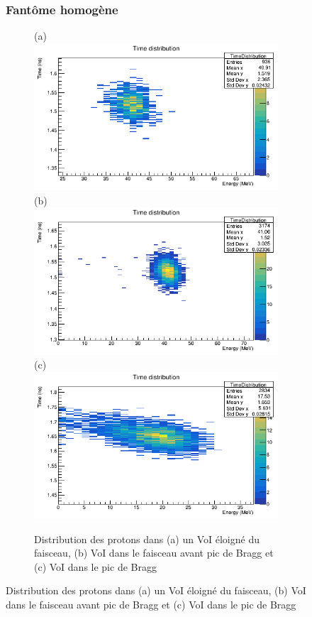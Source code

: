 \documentclass[11pt,a4paper,oldfontcommands]{memoir}
\begin{document}
\begin{figure}
\subsubsection{Fantôme homogène}
\begin{figure}[h!]
\centering
\subfloat(a){\includegraphics[scale=0.3]{homo/away.png}}
\subfloat(b){\includegraphics[scale=0.3]{homo/prebragg.png}}\\
\subfloat(c){\includegraphics[scale=0.3]{homo/Bragg.png}}
\label{homo prot}
\caption{ Distribution des protons dans (a) un VoI éloigné du faisceau, (b) VoI dans le faisceau avant pic de Bragg et (c) VoI dans le pic de Bragg }


\end{figure}
\end{figure}
\end{document}
